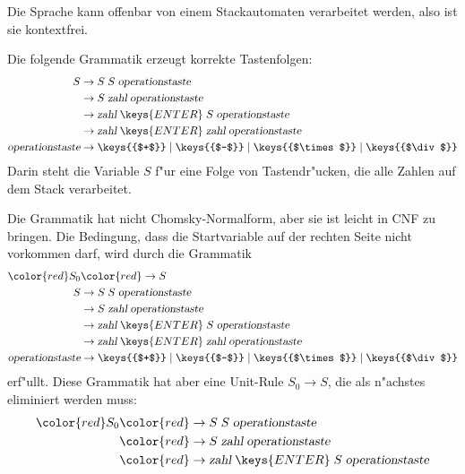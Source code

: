 \begin{loesung}
\begin{teilaufgaben}
\item Die Sprache kann offenbar von einem Stackautomaten verarbeitet werden,
also ist sie kontextfrei.
\item Die folgende Grammatik erzeugt korrekte Tastenfolgen:
\begin{align*}
S&\rightarrow S \; S \; \textsl{operationstaste}
\\
 &\rightarrow S \; \textsl{zahl} \; \textsl{operationstaste}
\\
 &\rightarrow \textsl{zahl}\;\keys{ENTER}\; S\;\textsl{operationstaste}
\\
 &\rightarrow \textsl{zahl}\;\keys{ENTER}\; \textsl{zahl}\;\textsl{operationstaste}
\\
\textsl{operationstaste}&\rightarrow
\keys{{$+$}}
\;|\;
\keys{{$-$}}
\;|\;
\keys{{$\times$}}
\;|\;
\keys{{$\div$}}
\\
\end{align*}
Darin steht die Variable $S$ f"ur eine Folge von Tastendr"ucken, die
alle Zahlen auf dem Stack verarbeitet.
\item
Die Grammatik hat nicht Chomsky-Normalform, aber sie ist leicht in
CNF zu bringen. Die Bedingung, dass die Startvariable auf der rechten
Seite nicht vorkommen darf, wird durch die Grammatik
\begin{align*}
\color{red}S_0&\color{red}\rightarrow S
\\
S&\rightarrow S \; S \; \textsl{operationstaste}
\\
 &\rightarrow S \; \textsl{zahl} \; \textsl{operationstaste}
\\
 &\rightarrow \textsl{zahl}\;\keys{ENTER}\; S\;\textsl{operationstaste}
\\
 &\rightarrow \textsl{zahl}\;\keys{ENTER}\; \textsl{zahl}\;\textsl{operationstaste}
\\
\textsl{operationstaste}&\rightarrow
\keys{{$+$}}
\;|\;
\keys{{$-$}}
\;|\;
\keys{{$\times$}}
\;|\;
\keys{{$\div$}}
\end{align*}
erf"ullt. Diese Grammatik hat aber eine Unit-Rule $S_0\to S$, die als n"achstes
eliminiert werden muss:
\begin{align*}
\color{red}S_0&\color{red}\rightarrow S \; S \; \textsl{operationstaste}
\\
 &\color{red}\rightarrow S \; \textsl{zahl} \; \textsl{operationstaste}
\\
 &\color{red}\rightarrow \textsl{zahl}\;\keys{ENTER}\; S\;\textsl{operationstaste}

\end{align*}
\end{teilaufgaben}
\end{loesung}
